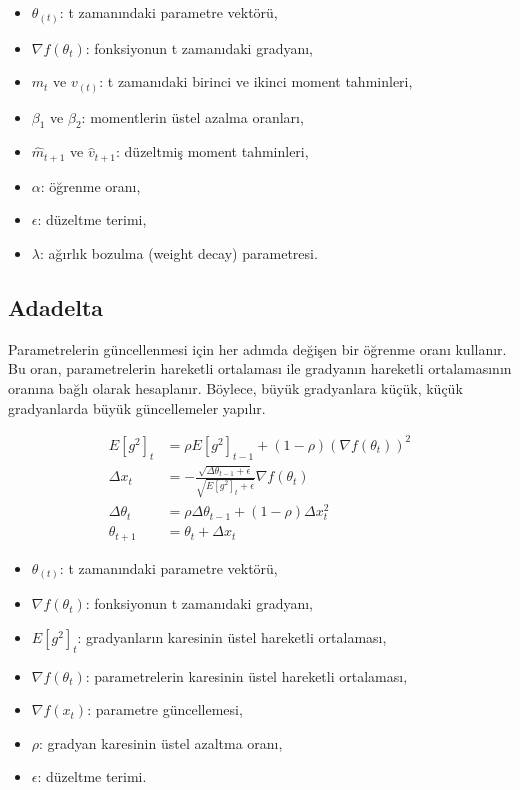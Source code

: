 \begin{itemize}
	\item $\theta_(t)$: t zamanındaki parametre vektörü,
	\item $\nabla f(\theta_{t})$: fonksiyonun t zamanıdaki gradyanı,
	\item $m_{t}$ ve $v_(t)$: t zamanıdaki birinci ve ikinci moment tahminleri,
	\item $\beta_{1}$ ve $\beta_{2}$: momentlerin üstel azalma oranları,
	\item $\hat{m}_{t+1}$ ve $\hat{v}_{t+1}$: düzeltmiş moment tahminleri,
	\item $\alpha$: öğrenme oranı,
	\item $\epsilon$: düzeltme terimi,
	\item $\lambda$: ağırlık bozulma (weight decay) parametresi.
\end{itemize}

\newpage

\subsection{Adadelta}
Parametrelerin güncellenmesi için her adımda değişen bir öğrenme oranı kullanır. Bu oran, parametrelerin hareketli ortalaması ile gradyanın hareketli ortalamasının oranına bağlı olarak hesaplanır. Böylece, büyük gradyanlara küçük, küçük gradyanlarda büyük güncellemeler yapılır.

\begin{align*}
E[g^2]_t & = \rho E[g^2]_{t-1} + (1 - \rho) (\nabla f(\theta_t))^2 \\
\Delta x_t & = - \frac{\sqrt{\Delta \theta_{t-1} + \epsilon}}{\sqrt{E[g^2]_t + \epsilon}} \nabla f(\theta_t) \\
\Delta \theta_t & = \rho \Delta \theta_{t-1} + (1 - \rho) \Delta x_t^2 \\
\theta_{t+1} & = \theta_t + \Delta x_t
\end{align*}

\begin{itemize}
	\item $\theta_(t)$: t zamanındaki parametre vektörü,
	\item $\nabla f(\theta_{t})$: fonksiyonun t zamanıdaki gradyanı,
	\item $E[g^2]_t$: gradyanların karesinin üstel hareketli ortalaması,
	\item $\nabla f(\theta_t)$: parametrelerin karesinin üstel hareketli ortalaması,
	\item $\nabla f(x_t)$: parametre güncellemesi,
	\item $\rho$: gradyan karesinin üstel azaltma oranı,
	\item $\epsilon$: düzeltme terimi.
\end{itemize}

